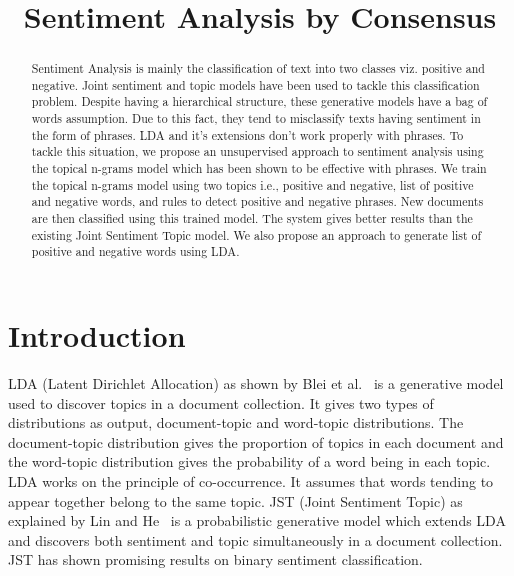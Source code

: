 \documentclass[11pt]{article}
\title{Sentiment Analysis by Consensus}
\date{}
\begin{document}
\maketitle
\begin{abstract}
Sentiment Analysis is mainly the classification of text into two classes viz. 
positive and negative. Joint sentiment and topic models have been used to 
tackle this classification problem.  Despite having a hierarchical structure, 
these generative models have a bag of words assumption. Due to this fact, 
they tend to misclassify texts having sentiment in the form of phrases. LDA 
and it's extensions don't work properly with phrases. To tackle this situation, 
we propose an unsupervised approach to sentiment analysis using the topical n-grams model
which has been shown to be effective with phrases. We train the topical n-grams 
model using two topics i.e., positive and negative, list of positive and negative 
words, and rules to detect positive and negative phrases. New documents are then 
classified using this trained model. The system gives better results than the 
existing Joint Sentiment Topic model. We also propose an approach to generate 
list of positive and negative words using LDA.

\end{abstract}

\section{Introduction}


\indent LDA (Latent Dirichlet Allocation) as shown by Blei et al.~ 
is a generative model used to discover topics in a document collection. It gives two types of 
distributions as output, document-topic and word-topic distributions. The document-topic
distribution gives the proportion of topics in each document and the word-topic 
distribution gives the probability of a word being in each topic. LDA works on the 
principle of co-occurrence. It assumes that words tending to appear together belong 
to the same topic. JST (Joint Sentiment Topic) as explained by Lin and He~ 
is a probabilistic generative model which extends LDA and discovers both sentiment 
and topic simultaneously in a document collection. JST has shown promising results 
on binary sentiment classification. 
\end{document}
